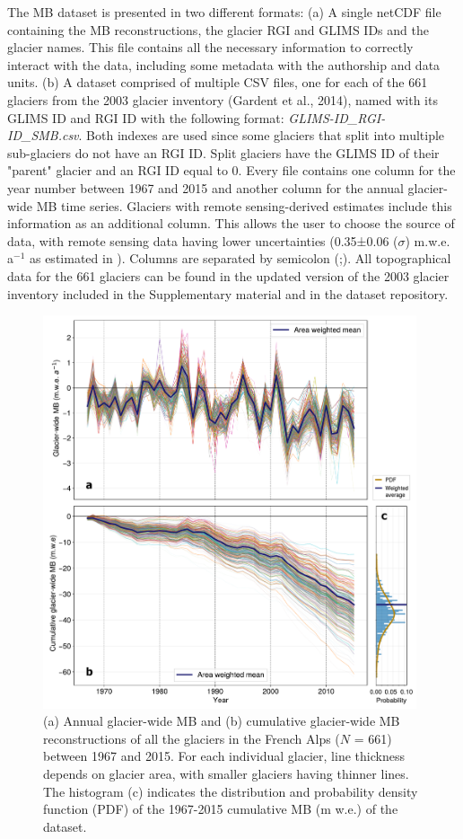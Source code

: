 The MB dataset is presented in two different formats: (a) A single netCDF file containing the MB reconstructions, the glacier RGI and GLIMS IDs and the glacier names. This file contains all the necessary information to correctly interact with the data, including some metadata with the authorship and data units. (b) A dataset comprised of multiple CSV files, one for each of the 661 glaciers from the 2003 glacier inventory (Gardent et al., 2014), named with its GLIMS ID and RGI ID with the following format: \textit{ GLIMS-ID\_RGI-ID\_SMB.csv}. Both indexes are used since some glaciers that split into multiple sub-glaciers do not have an RGI ID. Split glaciers have the GLIMS ID of their "parent" glacier and an RGI ID equal to 0. Every file contains one column for the year number between 1967 and 2015 and another column for the annual glacier-wide MB time series. Glaciers with remote sensing-derived estimates \citep{rabatel_spatio-temporal_2016} include this information as an additional column. This allows the user to choose the source of data, with remote sensing data having lower uncertainties (0.35±0.06 ($\sigma$) m.w.e. a$^{-1}$ as estimated in \citet{rabatel_spatio-temporal_2016}). Columns are separated by semicolon (;). All topographical data for the 661 glaciers can be found in the updated version of the 2003 glacier inventory included in the Supplementary material and in the dataset repository. 

\begin{figure}[t]
\centering
\includegraphics[width=11cm]{Figures/past/Figure_3.pdf}
\captionsetup{justification=centering}
\caption{(a) Annual glacier-wide MB and (b) cumulative glacier-wide MB reconstructions of all the glaciers in the French Alps ($N$ = 661) between 1967 and 2015. For each individual glacier, line thickness depends on glacier area, with smaller glaciers having thinner lines. The histogram (c) indicates the distribution and probability density function (PDF) of the 1967-2015 cumulative MB (m w.e.) of the dataset.}
\label{past:fig3}
\end{figure}

